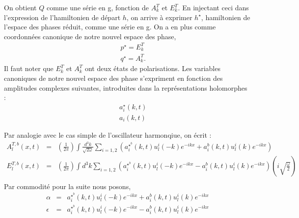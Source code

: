 \documentclass[a4paper,11pt]{article} %
\theoremstyle{plain}
\theoremstyle{definition}
\theoremstyle{remark}
\numberwithin{equation}{section}
\numberwithin{equation}{subsection}
\numberwithin{figure}{section}
\begin{document}
On obtient $Q$ comme une série en g, fonction de $A^{T}_{k}$ et $E_{k}^{T}$. En injectant ceci dans l'expression de l'hamiltonien de départ $h$, on arrive à exprimer $h^{\star}$, hamiltonien de l'espace des phases réduit, comme une série en g. On a en plus comme coordonnées canonique de notre nouvel espace des phase, 
\begin{eqnarray*}
 && p^{\star} = E_{k}^{T} \\
 && q^{\star} = A_{k}^{T}.
\end{eqnarray*}
Il faut noter que $E_{k}^{T}$ et $A_{k}^{T}$ ont deux états de polarisations. Les variables canoniques de notre nouvel espace des phase s'expriment en fonction des amplitudes complexes suivantes, introduites dans la représentations holomorphes :
\begin{eqnarray*}
 &&a^{\star}_{i}(k,t)\\
 &&a_{i}(k,t)
\end{eqnarray*}

\noindent
Par analogie avec le cas simple de l'oscillateur harmonqiue, on écrit  :
\begin{eqnarray*}
 A^{T,b}_{l} (x,t) &=& \left( \frac{1}{2 \pi} \right)  \int \frac{ d^{3}k }{ \sqrt{2 \omega} } 
\sum_{i=1,2} \left(  a^{\star^{b}}_{i}(k,t) u^{i}_{l}(-k) e^{-ikx}  +   a^{b}_{i}(k,t) u^{i}_{l}(k) e^{-ikx}  \right)\\
 E^{T,b}_{l} (x,t) &=& \left( \frac{1}{2 \pi} \right)  \int d^{3}k 
\sum_{i=1,2} \left(  a^{\star^{b}}_{i}(k,t) u^{i}_{l}(-k) e^{-ikx}  -   a^{b}_{i}(k,t) u^{i}_{l}(k) e^{-ikx}  \right) 
\left(i \sqrt{\frac{\omega}{2}} \right) \nonumber \\
\end{eqnarray*}
Par commodité pour la suite nous posons,
\begin{eqnarray*}
 \alpha &=& a^{\star^{b}}_{i}(k,t) u^{i}_{l}(-k) e^{-ikx}  +   a^{b}_{i}(k,t) u^{i}_{l}(k) e^{-ikx}\\
 \epsilon &=& a^{\star^{b}}_{i}(k,t) u^{i}_{l}(-k) e^{-ikx}  -   a^{b}_{i}(k,t) u^{i}_{l}(k) e^{-ikx}
\end{eqnarray*}
\end{document}
